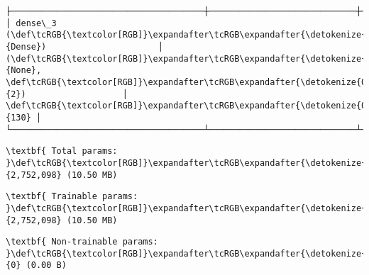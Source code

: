 \documentclass[11pt]{article}
\begin{document}
\begin{Verbatim}[commandchars=\\\{\}]
├──────────────────────────────────────┼─────────────────────────────┼─────────────────┤
│ dense\_3 (\def\tcRGB{\textcolor[RGB]}\expandafter\tcRGB\expandafter{\detokenize{0,135,255}}{Dense})                      │ (\def\tcRGB{\textcolor[RGB]}\expandafter\tcRGB\expandafter{\detokenize{0,215,255}}{None}, \def\tcRGB{\textcolor[RGB]}\expandafter\tcRGB\expandafter{\detokenize{0,175,0}}{2})                   │             \def\tcRGB{\textcolor[RGB]}\expandafter\tcRGB\expandafter{\detokenize{0,175,0}}{130} │
└──────────────────────────────────────┴─────────────────────────────┴─────────────────┘

    \end{Verbatim}

    
    
    \begin{Verbatim}[commandchars=\\\{\}]
\textbf{ Total params: }\def\tcRGB{\textcolor[RGB]}\expandafter\tcRGB\expandafter{\detokenize{0,175,0}}{2,752,098} (10.50 MB)

    \end{Verbatim}

    
    
    \begin{Verbatim}[commandchars=\\\{\}]
\textbf{ Trainable params: }\def\tcRGB{\textcolor[RGB]}\expandafter\tcRGB\expandafter{\detokenize{0,175,0}}{2,752,098} (10.50 MB)

    \end{Verbatim}

    
    
    \begin{Verbatim}[commandchars=\\\{\}]
\textbf{ Non-trainable params: }\def\tcRGB{\textcolor[RGB]}\expandafter\tcRGB\expandafter{\detokenize{0,175,0}}{0} (0.00 B)

    \end{Verbatim}
\end{document}
